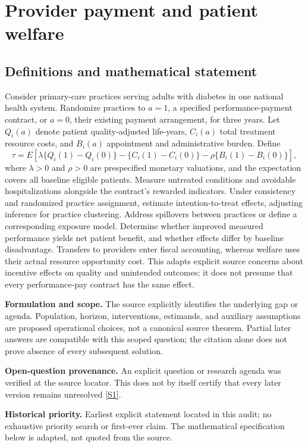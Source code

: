 \documentclass[11pt]{article}
\newcommand{\sref}[2]{\hyperlink{source:#1:#2}{[S#2]}}
\begin{document}
\section*{Provider payment and patient welfare}\label{30007725}
\subsection{Definitions and mathematical statement}
Consider primary-care practices serving adults with diabetes in one national health system. Randomize practices to \(a=1\), a specified performance-payment contract, or \(a=0\), their existing payment arrangement, for three years. Let \(Q_i(a)\) denote patient quality-adjusted life-years, \(C_i(a)\) total treatment resource costs, and \(B_i(a)\) appointment and administrative burden. Define
\[\tau=E[\lambda\{Q_i(1)-Q_i(0)\}-\{C_i(1)-C_i(0)\}-\rho\{B_i(1)-B_i(0)\}],\]
where \(\lambda>0\) and \(\rho>0\) are prespecified monetary valuations, and the expectation covers all baseline eligible patients. Measure untreated conditions and avoidable hospitalizations alongside the contract’s rewarded indicators. Under consistency and randomized practice assignment, estimate intention-to-treat effects, adjusting inference for practice clustering. Address spillovers between practices or define a corresponding exposure model. Determine whether improved measured performance yields net patient benefit, and whether effects differ by baseline disadvantage. Transfers to providers enter fiscal accounting, whereas welfare uses their actual resource opportunity cost. This adapts explicit source concerns about incentive effects on quality and unintended outcomes; it does not presume that every performance-pay contract has the same effect.

\par\textbf{Formulation and scope.} The source explicitly identifies the underlying gap or agenda. Population, horizon, interventions, estimands, and auxiliary assumptions are proposed operational choices, not a canonical source theorem. Partial later answers are compatible with this scoped question; the citation alone does not prove absence of every subsequent solution.

\par\textbf{Open-question provenance.} An explicit question or research agenda was verified at the source locator. This does not by itself certify that every later version remains unresolved \sref{30007725}{1}.

\par\textbf{Historical priority.} Earliest explicit statement located in this audit; no exhaustive priority search or first-ever claim. The mathematical specification below is adapted, not quoted from the source.
\end{document}
